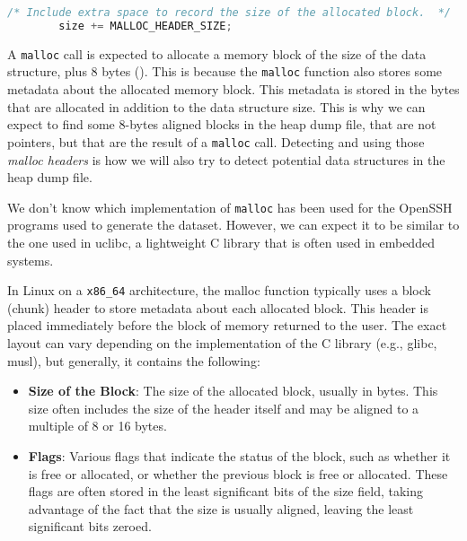     \begin{minipage}{\dimexpr\linewidth-20pt}
        \begin{lstlisting}[language=c, caption={Malloc implementation for uclibc}]
        /* Include extra space to record the size of the allocated block.  */
        size += MALLOC_HEADER_SIZE;
        \end{lstlisting}
    \end{minipage}
    
    A \lstinline[language=c]|malloc| call is expected to allocate a memory block of the size of the data structure, plus 8 bytes (). This is because the \lstinline[language=c]|malloc| function also stores some metadata about the allocated memory block. This metadata is stored in the bytes that are allocated in addition to the data structure size. This is why we can expect to find some 8-bytes aligned blocks in the heap dump file, that are not pointers, but that are the result of a \lstinline[language=c]|malloc| call. Detecting and using those \textit{malloc headers} is how we will also try to detect potential data structures in the heap dump file.

    We don't know which implementation of \lstinline[language=c]|malloc| has been used for the OpenSSH programs used to generate the dataset. However, we can expect it to be similar to the one used in uclibc, a lightweight C library that is often used in embedded systems. 

    In Linux on a \texttt{x86\_64} architecture, the malloc function typically uses a block (chunk) header to store metadata about each allocated block. This header is placed immediately before the block of memory returned to the user. The exact layout can vary depending on the implementation of the C library (e.g., glibc, musl), but generally, it contains the following:

    \begin{itemize}
        \item \textbf{Size of the Block}: The size of the allocated block, usually in bytes. This size often includes the size of the header itself and may be aligned to a multiple of 8 or 16 bytes.
        \item \textbf{Flags}: Various flags that indicate the status of the block, such as whether it is free or allocated, or whether the previous block is free or allocated. These flags are often stored in the least significant bits of the size field, taking advantage of the fact that the size is usually aligned, leaving the least significant bits zeroed.
    \end{itemize}
    

